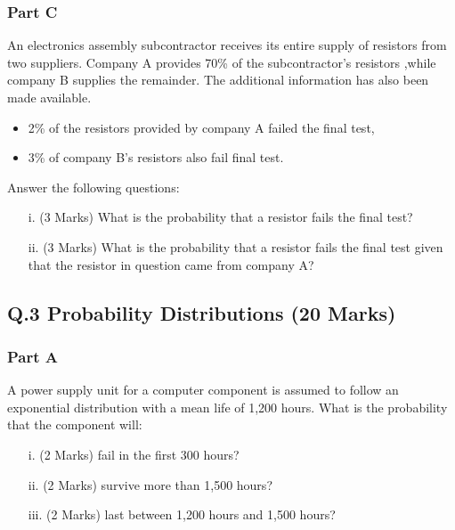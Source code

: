 \subsubsection*{Part C}
An electronics assembly subcontractor receives its entire supply of resistors from two suppliers. Company A provides 70\% of the subcontractor's resistors ,while company B supplies the remainder. The additional information has also been made available.
\begin{itemize}
\item 2\% of the resistors provided by company A failed the final test,
\item 3\% of company B's resistors also fail final test.
\end{itemize}
\noindent Answer the following questions:
\begin{itemize}
\item[i.](3 Marks) What is the probability that a resistor fails the final test?
\item[ii.](3 Marks)  What is the probability that a resistor fails the final test given that the resistor in question came from company A?
\end{itemize}

\newpage


\subsection*{Q.3 Probability Distributions (20 Marks)}

\subsubsection*{Part A} %
A power supply unit for a computer component is assumed to follow an exponential distribution with a mean life of 1,200 hours.  What is the probability that the component will:
\begin{itemize}
\item [i.](2 Marks)	fail in the first 300 hours?
\item [ii.](2 Marks)	survive more than 1,500 hours?
\item [iii.](2 Marks) last between 1,200 hours and 1,500 hours?
\end{itemize}

